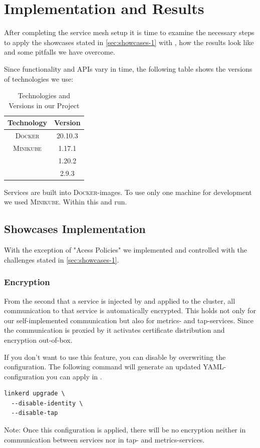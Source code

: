 \section{Implementation and Results}

After completing the service mesh setup it is time to examine the necessary steps to apply the showcases stated in \autoref{sec:showcases-1} with \linkerd{}, how the results look like and some pitfalls we have overcome.

Since functionality and APIs vary in time, the following table shows the versions of technologies we use:
\begin{table}[h]
\centering	
\begin{tabular}{c|c}
	Technology & Version \\\hline
	\textsc{Docker} & 20.10.3\\\hline
	\textsc{Minikube} & 1.17.1\\\hline
	\kubernetes & 1.20.2\\\hline
	\linkerd & 2.9.3 \\
\end{tabular}
\vspace{0.25mm}
\caption{Technologies and Versions in our Project}
\label{tab:versions}
\end{table}

Services are built into \textsc{Docker}-images.
To use only one machine for development we used \textsc{Minikube}.
Within this \kubernetes{} and \linkerd{} run.

\subsection{Showcases Implementation}
With the exception of "Acess Policies" we implemented and controlled with \linkerd{} the challenges stated in \autoref{sec:showcases-1}.

\subsubsection{Encryption}
From the second that a service is injected by \linkerd{} and applied to the cluster, all communication to that service is automatically encrypted.
This holds not only for our self-implemented communication but also for metrics- and tap-services.
Since the communication is proxied by \linkerd{} it activates certificate distribution and encryption out-of-box.

If you don't want to use this feature, you can disable by overwriting the \linkerd{} configuration.
The following command will generate an updated YAML-configuration you can apply in \kubernetes{}.
\begin{lstlisting}
linkerd upgrade \
  --disable-identity \
  --disable-tap
\end{lstlisting}
Note: Once this configuration is applied, there will be no encryption neither in communication between services nor in tap- and metrics-services.

